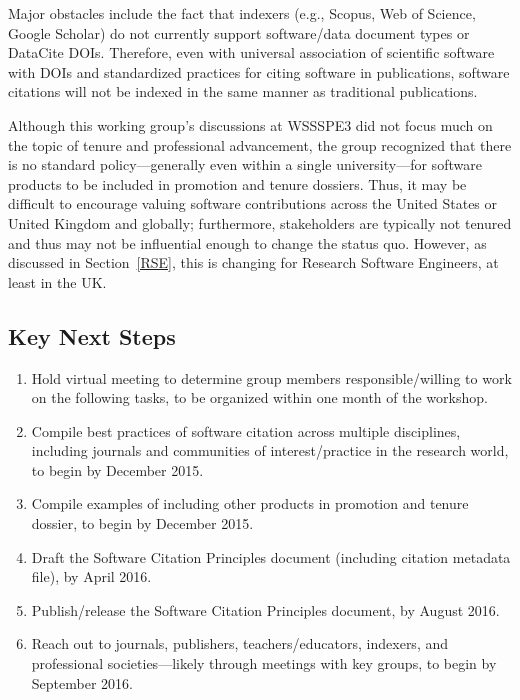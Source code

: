 Major obstacles include the fact that indexers (e.g., Scopus, Web of Science,
Google Scholar) do not currently support software/data document types or
DataCite DOIs. Therefore, even with universal association of scientific software
with DOIs and standardized practices for citing software in publications,
software citations will not be indexed in the same manner as traditional
publications.

Although this working group's discussions at WSSSPE3 did not focus much on the
topic of tenure and professional advancement, 
the group recognized that there is no standard policy---generally even within a
single university---for software products to be included in promotion and tenure
dossiers. Thus, it may be difficult to encourage valuing software contributions
across the United States or United Kingdom and globally; furthermore,
stakeholders are typically not tenured and thus may not be influential enough to
change the status quo. However, as discussed in Section~\ref{RSE}, this is
changing for Research Software Engineers, at least in the UK.

\subsection{Key Next Steps}
\label{SC:next-steps}

\begin{enumerate}

\item Hold virtual meeting to determine group members responsible\slash willing
to work on the following tasks, to be organized within one month of the workshop.

\item Compile best practices of software citation across multiple disciplines,
including journals and communities of interest\slash practice in the research
world, to begin by December 2015.

\item Compile examples of including other products in promotion and tenure
dossier, to begin by December 2015.

\item Draft the Software Citation Principles document (including citation
metadata file), by April 2016.

\item Publish\slash release the Software Citation Principles document, by August
2016.

\item Reach out to journals, publishers, teachers\slash educators, indexers, and
professional societies---likely through meetings with key groups, to begin by
September 2016.

\end{enumerate}

